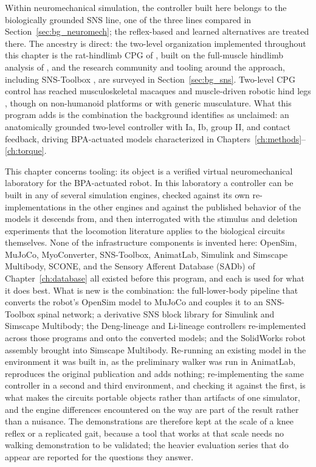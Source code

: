 Within neuromechanical simulation, the controller built here belongs to the biologically grounded SNS line, one of the three lines compared in Section~\ref{sec:bg_neuromech}; the reflex-based and learned alternatives \citep{geyer_musclereflex_2010, song_deep_2021} are treated there. The ancestry is direct: the two-level organization implemented throughout this chapter is the rat-hindlimb CPG of \citet{deng_neuromechanical_2019}, built on the full-muscle hindlimb analysis of \citet{young_analyzing_2019}, and the research community and tooling around the approach, including SNS-Toolbox \citep{nourse_sns_2023}, are surveyed in Section~\ref{sec:bg_sns}. Two-level CPG control has reached musculoskeletal macaques and muscle-driven robotic hind legs \citep{nishizaki_gait_2026, fukuoka_autonomous_2021}, though on non-humanoid platforms or with generic musculature. What this program adds is the combination the background identifies as unclaimed: an anatomically grounded two-level controller with Ia, Ib, group II, and contact feedback, driving BPA-actuated models characterized in Chapters~\ref{ch:methods}--\ref{ch:torque}.

This chapter concerns tooling: its object is a verified virtual neuromechanical laboratory for the BPA-actuated robot. In this laboratory a controller can be built in any of several simulation engines, checked against its own re-implementations in the other engines and against the published behavior of the models it descends from, and then interrogated with the stimulus and deletion experiments that the locomotion literature applies to the biological circuits themselves. None of the infrastructure components is invented here: OpenSim, MuJoCo, MyoConverter, SNS-Toolbox, AnimatLab, Simulink and Simscape Multibody, SCONE, and the Sensory Afferent Database (SADb) of Chapter~\ref{ch:database} all existed before this program, and each is used for what it does best. What is new is the combination: the full-lower-body pipeline that converts the robot's OpenSim model to MuJoCo and couples it to an SNS-Toolbox spinal network; a derivative SNS block library for Simulink and Simscape Multibody; the Deng-lineage and Li-lineage controllers re-implemented across those programs and onto the converted models; and the SolidWorks robot assembly brought into Simscape Multibody. Re-running an existing model in the environment it was built in, as the preliminary walker was run in AnimatLab, reproduces the original publication and adds nothing; re-implementing the same controller in a second and third environment, and checking it against the first, is what makes the circuits portable objects rather than artifacts of one simulator, and the engine differences encountered on the way are part of the result rather than a nuisance. The demonstrations are therefore kept at the scale of a knee reflex or a replicated gait, because a tool that works at that scale needs no walking demonstration to be validated; the heavier evaluation series that do appear are reported for the questions they answer.

